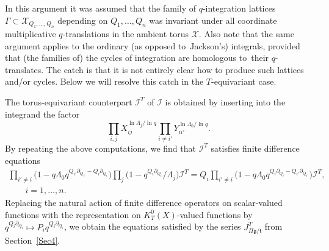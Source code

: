 \documentclass[10pt,a4paper]{amsart}
\numberwithin{equation}{section}
\def\I{\mathcal I}
\def\X{\mathcal X}
\def\p{\partial}
\theoremstyle{definition}
\theoremstyle{plain}
\begin{document}
In this argument it was assumed that the family of $q$-integration
lattices $\Gamma\subset \X_{Q_1,\dots,Q_n}$ depending on $Q_1,\dots,Q_n$ was invariant
under all coordinate multiplicative $q$-translations in the ambient torus $\X$.
Also note that the same argument applies to the ordinary (as opposed to~Jackson's)
integrals, provided that (the families of) the cycles of integration are homologous to~their $q$-translates. The catch is that it is not entirely clear how to produce
such lattices and/or cycles. Below we will resolve this catch in the $T$-equivariant case.

The torus-equivariant counterpart $\I^T$ of $\I$ is obtained by inserting into the integrand the factor
\[
\prod_{i,j}X_{ij}^{\ln \Lambda_j/\ln q} \prod_{i\neq i'} Y_{ii'}^{\ln \Lambda_0/\ln q}.
\]
By repeating the above computations, we find that $\I^T$ satisfies finite difference equations
\begin{gather*}
\prod_{i'\neq i}\big(1-q \Lambda_0 q^{Q_{i'}\p_{Q_{i'}}-Q_i\p_{Q_i}}\big) \prod_j\big(1-q^{Q_i\p_{Q_i}}/\Lambda_j\big) \I^T
 = Q_i\prod_{i'\neq i} \big(1-q\Lambda_0 q^{Q_i\p_{Q_i}-Q_{i'}\p_{Q_{i'}}}\big) \I^T,
 \\
 \qquad i=1,\dots, n.
\end{gather*}
Replacing the natural action of finite difference operators on scalar-valued functions with the representation on $K^0_T(X)$-valued functions by $q^{Q_i\p_{Q_i}}\mapsto P_iq^{Q_i\p_{Q_i}}$, we obtain the equations satisfied by the series $J^T_{\Pi\mathfrak{g}/\mathfrak{t}}$ from Section~\ref{Sec4}.
\end{document}
